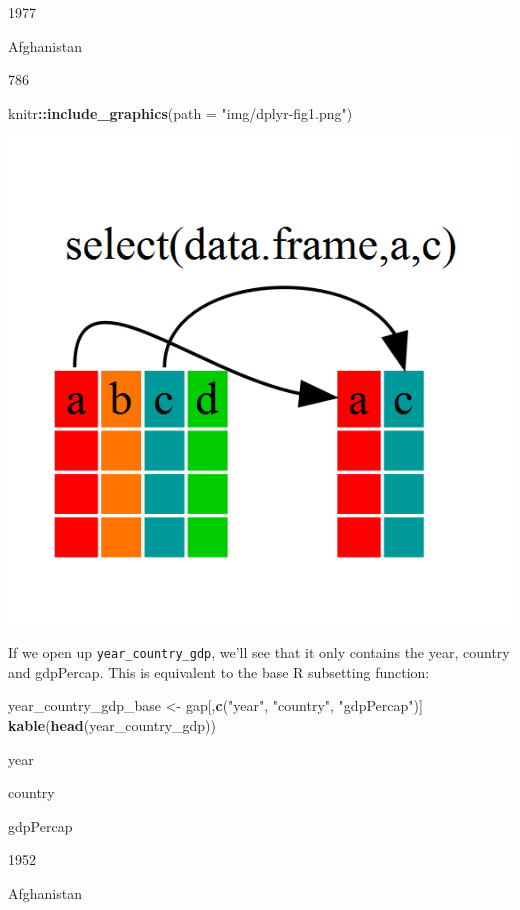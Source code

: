 \documentclass[]{book}
\newenvironment{Shaded}{\begin{snugshade}}{\end{snugshade}}
\newcommand{\DataTypeTok}[1]{\textcolor[rgb]{0.13,0.29,0.53}{#1}}
\newcommand{\KeywordTok}[1]{\textcolor[rgb]{0.13,0.29,0.53}{\textbf{#1}}}
\newcommand{\NormalTok}[1]{#1}
\newcommand{\OperatorTok}[1]{\textcolor[rgb]{0.81,0.36,0.00}{\textbf{#1}}}
\newcommand{\StringTok}[1]{\textcolor[rgb]{0.31,0.60,0.02}{#1}}
\begin{document}
1977

Afghanistan

786

\begin{Shaded}
\begin{Highlighting}[]
\NormalTok{knitr}\OperatorTok{::}\KeywordTok{include_graphics}\NormalTok{(}\DataTypeTok{path =} \StringTok{"img/dplyr-fig1.png"}\NormalTok{)}
\end{Highlighting}
\end{Shaded}

\begin{center}\includegraphics[width=0.7\linewidth]{img/dplyr-fig1} \end{center}

If we open up \texttt{year\_country\_gdp}, we'll see that it only contains the year, country and gdpPercap. This is equivalent to the base R subsetting function:

\begin{Shaded}
\begin{Highlighting}[]
\NormalTok{year_country_gdp_base <-}\StringTok{ }\NormalTok{gap[,}\KeywordTok{c}\NormalTok{(}\StringTok{"year"}\NormalTok{, }\StringTok{"country"}\NormalTok{, }\StringTok{"gdpPercap"}\NormalTok{)]}
\KeywordTok{kable}\NormalTok{(}\KeywordTok{head}\NormalTok{(year_country_gdp))}
\end{Highlighting}
\end{Shaded}

year

country

gdpPercap

1952

Afghanistan
\end{document}
